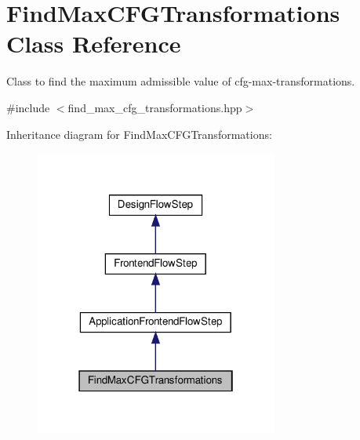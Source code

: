 \hypertarget{classFindMaxCFGTransformations}{}\section{Find\+Max\+C\+F\+G\+Transformations Class Reference}
\label{classFindMaxCFGTransformations}


Class to find the maximum admissible value of cfg-\/max-\/transformations.  




{\ttfamily \#include $<$find\+\_\+max\+\_\+cfg\+\_\+transformations.\+hpp$>$}



Inheritance diagram for Find\+Max\+C\+F\+G\+Transformations\+:
\nopagebreak
\begin{figure}[H]
\begin{center}
\leavevmode
\includegraphics[width=226pt]{df/d73/classFindMaxCFGTransformations__inherit__graph}
\end{center}
\end{figure}


